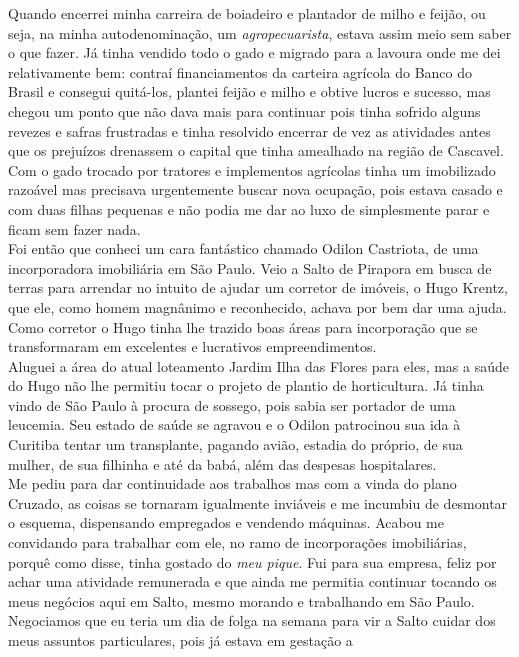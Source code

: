 \documentclass[12pt,brazil,]{book}
\begin{document}
Quando encerrei minha carreira de boiadeiro e plantador de milho e
feijão, ou seja, na minha autodenominação, um \emph{agropecuarista},
estava assim meio sem saber o que fazer. Já tinha vendido todo o gado e
migrado para a lavoura onde me dei relativamente bem: contraí
financiamentos da carteira agrícola do Banco do Brasil e consegui
quitá-los, plantei feijão e milho e obtive lucros e sucesso, mas chegou
um ponto que não dava mais para continuar pois tinha sofrido alguns
revezes e safras frustradas e tinha resolvido encerrar de vez as
atividades antes que os prejuízos drenassem o capital que tinha
amealhado na região de Cascavel. Com o gado trocado por tratores e
implementos agrícolas tinha um imobilizado razoável mas precisava
urgentemente buscar nova ocupação, pois estava casado e com duas filhas
pequenas e não podia me dar ao luxo de simplesmente parar e ficam sem
fazer nada.\\
Foi então que conheci um cara fantástico chamado Odilon Castriota, de
uma incorporadora imobiliária em São Paulo. Veio a Salto de Pirapora em
busca de terras para arrendar no intuito de ajudar um corretor de
imóveis, o Hugo Krentz, que ele, como homem magnânimo e reconhecido,
achava por bem dar uma ajuda. Como corretor o Hugo tinha lhe trazido
boas áreas para incorporação que se transformaram em excelentes e
lucrativos empreendimentos.\\
Aluguei a área do atual loteamento Jardim Ilha das Flores para eles, mas
a saúde do Hugo não lhe permitiu tocar o projeto de plantio de
horticultura. Já tinha vindo de São Paulo à procura de sossego, pois
sabia ser portador de uma leucemia. Seu estado de saúde se agravou e o
Odilon patrocinou sua ida à Curitiba tentar um transplante, pagando
avião, estadia do próprio, de sua mulher, de sua filhinha e até da babá,
além das despesas hospitalares.\\
Me pediu para dar continuidade aos trabalhos mas com a vinda do plano
Cruzado, as coisas se tornaram igualmente inviáveis e me incumbiu de
desmontar o esquema, dispensando empregados e vendendo máquinas. Acabou
me convidando para trabalhar com ele, no ramo de incorporações
imobiliárias, porquê como disse, tinha gostado do \emph{meu pique}. Fui
para sua empresa, feliz por achar uma atividade remunerada e que ainda
me permitia continuar tocando os meus negócios aqui em Salto, mesmo
morando e trabalhando em São Paulo.\\
Negociamos que eu teria um dia de folga na semana para vir a Salto
cuidar dos meus assuntos particulares, pois já estava em gestação a
\end{document}
